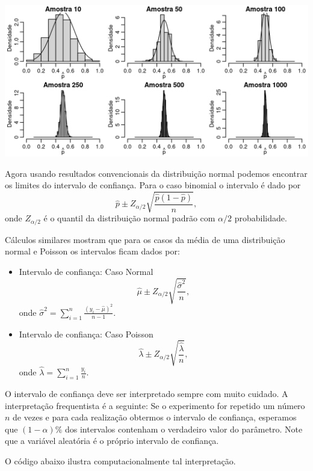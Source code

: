 \documentclass[
  10pt,
  a4paper]{book}
\begin{document}
\begin{center}\includegraphics[width=0.99\linewidth]{figures/unnamed-chunk-383-1} \end{center}

Agora usando resultados convencionais da distribuição normal podemos encontrar os limites do intervalo de confiança. Para o caso binomial o intervalo é dado por
\[\hat{p} \pm Z_{\alpha/2} \sqrt{\frac{\hat{p}(1-\hat{p})}{n}},\]
onde \(Z_{\alpha/2}\) é o quantil da distribuição normal padrão com \(\alpha/2\) probabilidade.

Cálculos similares mostram que para os casos da média de uma distribuição normal e Poisson os intervalos ficam dados por:

\begin{itemize}
\item
  Intervalo de confiança: Caso Normal
  \[\hat{\mu} \pm Z_{\alpha/2} \sqrt{\frac{\hat{\sigma}^2}{n}},\]
  onde \(\hat{\sigma}^2 = \sum_{i=1}^n \frac{(y_i - \hat{\mu})^2}{n-1}\).
\item
  Intervalo de confiança: Caso Poisson
  \[\hat{\lambda} \pm Z_{\alpha/2} \sqrt{\frac{\hat{\lambda}}{n}},\]
  onde \(\hat{\lambda} = \sum_{i=1}^n \frac{y_i}{n}.\)
\end{itemize}

O intervalo de confiança deve ser interpretado sempre com muito cuidado. A interpretação frequentista é a seguinte: Se o experimento for repetido um número \(n\) de vezes e para cada realização obtermos o intervalo de confiança, esperamos que \((1-\alpha)\%\) dos intervalos contenham o verdadeiro valor do parâmetro. Note que a variável aleatória é o próprio intervalo de confiança.

O código abaixo ilustra computacionalmente tal interpretação.
\end{document}
